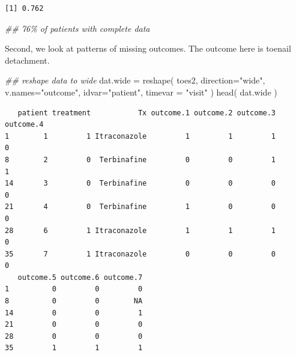 \documentclass[
  letterpaper,
  DIV=11,
  numbers=noendperiod]{scrreprt}
\newenvironment{Shaded}{\begin{snugshade}}{\end{snugshade}}
\newcommand{\AttributeTok}[1]{\textcolor[rgb]{0.49,0.56,0.16}{#1}}
\newcommand{\DecValTok}[1]{\textcolor[rgb]{0.25,0.63,0.44}{#1}}
\newcommand{\DocumentationTok}[1]{\textcolor[rgb]{0.73,0.13,0.13}{\textit{#1}}}
\newcommand{\FunctionTok}[1]{\textcolor[rgb]{0.02,0.16,0.49}{#1}}
\newcommand{\NormalTok}[1]{\textcolor[rgb]{0.00,0.44,0.13}{#1}}
\newcommand{\OtherTok}[1]{\textcolor[rgb]{0.00,0.44,0.13}{#1}}
\newcommand{\SpecialCharTok}[1]{\textcolor[rgb]{0.25,0.44,0.63}{#1}}
\newcommand{\StringTok}[1]{\textcolor[rgb]{0.25,0.44,0.63}{#1}}
\begin{document}
\begin{Shaded}
\end{Shaded}

\begin{verbatim}
[1] 0.762
\end{verbatim}

\begin{Shaded}
\begin{Highlighting}[]
  \DocumentationTok{\#\# 76\% of patients with complete data}
\end{Highlighting}
\end{Shaded}

Second, we look at patterns of missing outcomes. The outcome here is
toenail detachment.

\begin{Shaded}
\begin{Highlighting}[]
\DocumentationTok{\#\# reshape data to wide }
\NormalTok{  dat.wide }\OtherTok{=} \FunctionTok{reshape}\NormalTok{( toes2, }\AttributeTok{direction=}\StringTok{"wide"}\NormalTok{, }\AttributeTok{v.names=}\StringTok{"outcome"}\NormalTok{,}
                    \AttributeTok{idvar=}\StringTok{"patient"}\NormalTok{, }\AttributeTok{timevar =} \StringTok{"visit"}\NormalTok{ )}
  \FunctionTok{head}\NormalTok{( dat.wide )}
\end{Highlighting}
\end{Shaded}

\begin{verbatim}
   patient treatment           Tx outcome.1 outcome.2 outcome.3 outcome.4
1        1         1 Itraconazole         1         1         1         0
8        2         0  Terbinafine         0         0         1         1
14       3         0  Terbinafine         0         0         0         0
21       4         0  Terbinafine         1         0         0         0
28       6         1 Itraconazole         1         1         1         0
35       7         1 Itraconazole         0         0         0         0
   outcome.5 outcome.6 outcome.7
1          0         0         0
8          0         0        NA
14         0         0         1
21         0         0         0
28         0         0         0
35         1         1         1
\end{verbatim}
\end{document}

